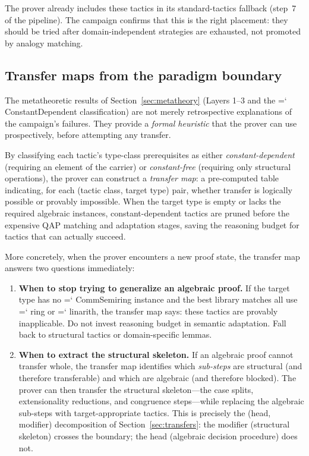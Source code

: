 \documentclass[11pt]{article}
\renewcommand{\texttt}[1]{%
  \begingroup\ttfamily\hyphenchar\font=`\-\relax
  \def\_{\textunderscore\discretionary{}{}{}}%
  #1\endgroup}
\theoremstyle{definition}
\theoremstyle{remark}
\begin{document}
The prover already includes these tactics in its standard-tactics
fallback (step~7 of the pipeline).  The campaign confirms that this
is the right placement: they should be tried after domain-independent
strategies are exhausted, not promoted by analogy matching.

\subsection{Transfer maps from the paradigm boundary}

The metatheoretic results of Section~\ref{sec:metatheory} (Layers
1--3 and the \texttt{ConstantDependent} classification) are not
merely retrospective explanations of the campaign's failures.  They
provide a \emph{formal heuristic} that the prover can use
prospectively, before attempting any transfer.

By classifying each tactic's type-class prerequisites as either
\emph{constant-dependent} (requiring an element of the carrier)
or \emph{constant-free} (requiring only structural operations),
the prover can construct a \emph{transfer map}: a pre-computed
table indicating, for each (tactic class, target type) pair,
whether transfer is logically possible or provably impossible.
When the target type is empty or lacks the required algebraic
instances, constant-dependent tactics are pruned before the
expensive QAP matching and adaptation stages, saving the
reasoning budget for tactics that can actually succeed.

More concretely, when the prover encounters a new proof state, the
transfer map answers two questions immediately:

\begin{enumerate}
\item \textbf{When to stop trying to generalize an algebraic proof.}
  If the target type has no \texttt{CommSemiring} instance and the
  best library matches all use \texttt{ring} or \texttt{linarith},
  the transfer map says: these tactics are provably inapplicable.
  Do not invest reasoning budget in semantic adaptation.  Fall back
  to structural tactics or domain-specific lemmas.

\item \textbf{When to extract the structural skeleton.}
  If an algebraic proof cannot transfer whole, the transfer map
  identifies which \emph{sub-steps} are structural (and therefore
  transferable) and which are algebraic (and therefore blocked).
  The prover can then transfer the structural skeleton---the
  case splits, extensionality reductions, and congruence steps---while
  replacing the algebraic sub-steps with target-appropriate tactics.
  This is precisely the (head, modifier) decomposition of
  Section~\ref{sec:transfers}: the modifier (structural skeleton)
  crosses the boundary; the head (algebraic decision procedure)
  does not.
\end{enumerate}
\end{document}
